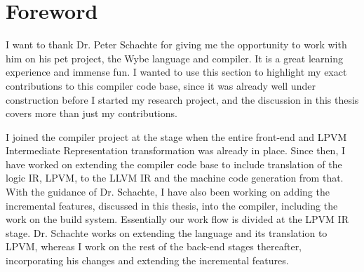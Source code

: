 \chapter*{Foreword}

I want to thank Dr. Peter Schachte for giving me the opportunity to work with
him on his pet project, the Wybe language and compiler. It is a great learning
experience and immense fun. I wanted to use this section to highlight my exact
contributions to this compiler code base, since it was already well under
construction before I started my research project, and the discussion in this
thesis covers more than just my contributions.

I joined the compiler project at the stage when the entire front-end and LPVM
Intermediate Representation transformation was already in place. Since then, I
have worked on extending the compiler code base to include translation of the
logic IR, LPVM, to the LLVM IR and the machine code generation from that. With
the guidance of Dr. Schachte, I have also been working on adding the
incremental features, discussed in this thesis, into the compiler, including
the work on the build system. Essentially our work flow is divided at the LPVM
IR stage. Dr. Schachte works on extending the language and its translation to
LPVM, whereas I work on the rest of the back-end stages thereafter,
incorporating his changes and extending the incremental features.


